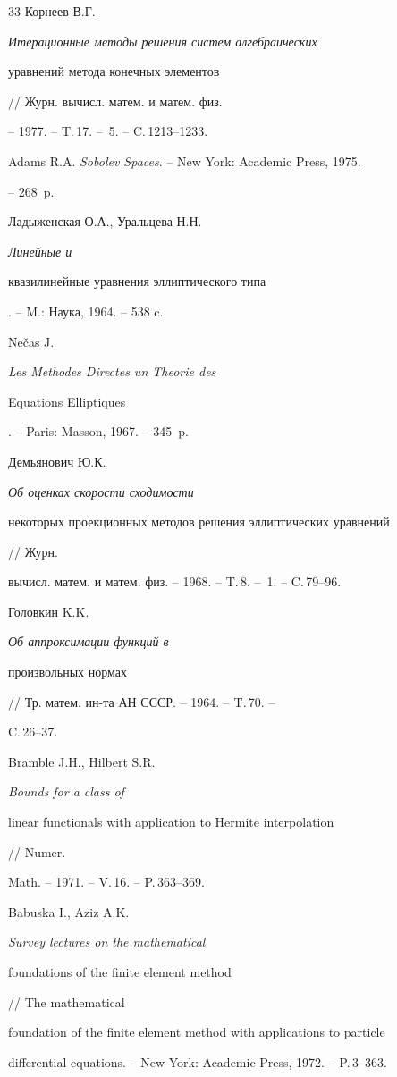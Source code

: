 \begin{thebibliography}{33}
Корнеев В.Г. {\em Итерационные методы решения систем алгебраических


уравнений метода конечных элементов} // Журн. вычисл. матем. и матем. физ.


-- 1977. -- T.\,17. -- \No\,5. -- C.\,1213--1233.


\bibitem{[1]} %


Adams R.A. {\it Sobolev Spaces}. -- New York: Academic Press, 1975.


-- 268~p.


\bibitem{[22]} %


Ладыженская О.А., Уральцева Н.Н. {\em Линейные и


квазилинейные уравнения эллиптического типа}. -- M.: Наука, 1964. -- 538 c.


\bibitem{[25]} %


Ne\v{c}as J. {\it Les Methodes Directes un Theorie des


Equations Elliptiques}. -- Paris: Masson, 1967. -- 345~p.


\bibitem{[10]} %


Демьянович Ю.К. {\em Об оценках скорости сходимости


некоторых проекционных методов решения эллиптических уравнений} // Журн.


вычисл. матем. и матем. физ. -- 1968. -- T.\,8. -- \No\,1. -- C.\,79--96.


\bibitem{[16]} %


Головкин K.K. {\em Об аппроксимации функций в


произвольных нормах} // Тр. матем. ин-та АН СССР. -- 1964. -- T.\,70. --


C.\,26--37.


\bibitem{[5]} %


Bramble J.H., Hilbert S.R. {\it Bounds for a class of


linear functionals with application to Hermite interpolation} // Numer.


Math. -- 1971. -- V.\,16. -- P.\,363--369.


\bibitem{[2]} %


Babuska I., Aziz A.K. {\it Survey lectures on the mathematical


foundations of the finite element method} // The mathematical


foundation of the finite element method with applications to particle


differential equations. -- New York: Academic Press, 1972. -- P.\,3--363.



\end{thebibliography}
